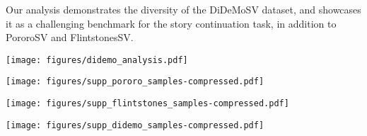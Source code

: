 \documentclass[runningheads]{llncs}
\newcommand{\sdalle}[1]{\textsc{StoryDALL-E}}
\begin{document}
Our analysis demonstrates the diversity of the DiDeMoSV dataset, and showcases it as a challenging benchmark for the story continuation task, in addition to PororoSV and FlintstonesSV.


\begin{figure*}
    \centering
    \texttt{[image: figures/didemo\_analysis.pdf]}
    \caption{Plots for frequency of (A) noun chunks and (B) verbs in the captions and (C) objects in the frames of the DiDeMoSV dataset.}
    \label{fig:didemo_analysis}
\end{figure*}


\begin{figure*}[t]
    \centering
    \texttt{[image: figures/supp\_pororo\_samples-compressed.pdf]}
    \caption{Generated samples from \sdalle{} for the PororoSV dataset.
    \label{fig:example_pororo}}
\end{figure*}

\begin{figure*}[t]
    \centering
    \texttt{[image: figures/supp\_flintstones\_samples-compressed.pdf]}
    \caption{Generated samples from \sdalle{} for the FlintstonesSV dataset.
    \label{fig:example_flintstones}}
\end{figure*}

\begin{figure*}[t]
    \centering
    \texttt{[image: figures/supp\_didemo\_samples-compressed.pdf]}
    \caption{Generated samples from \sdalle{} for the DiDeMoSV dataset.
    \label{fig:example_didemo}}
\end{figure*}
\end{document}
